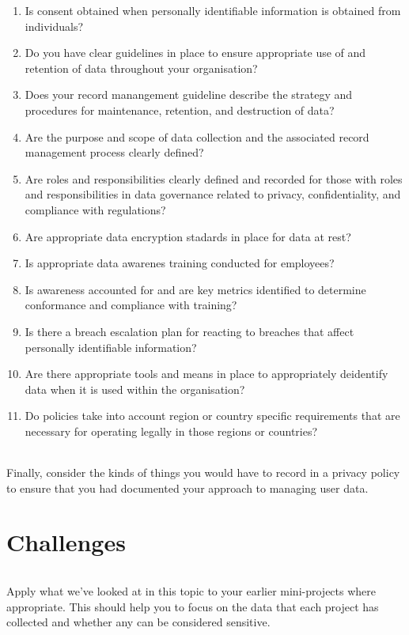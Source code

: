 \documentclass[10pt, a4paper, twosize]{article}
\begin{document}
\begin{enumerate}
\item Is consent obtained when personally identifiable information is obtained from individuals?
\item Do you have clear guidelines in place to ensure appropriate use of and retention of data throughout your organisation?
\item Does your record manangement guideline describe the strategy and procedures for maintenance, retention, and destruction of data?
\item Are the purpose and scope of data collection and the associated record management process clearly defined?
\item Are roles and responsibilities clearly defined and recorded for those with roles and responsibilities in data governance related to privacy, confidentiality, and compliance with regulations?
\item Are appropriate data encryption stadards in place for data at rest?
\item Is appropriate data awarenes training conducted for employees?
\item Is awareness accounted for and are key metrics identified to determine conformance and compliance with training?
\item Is there a breach escalation plan for reacting to breaches that affect personally identifiable information?
\item Are there appropriate tools and means in place to appropriately deidentify data when it is used within the organisation?
\item Do policies take into account region or country specific requirements that are necessary for operating legally in those regions or countries?
\end{enumerate}

\paragraph{} Finally, consider the kinds of things you would have to record in a privacy policy to ensure that you had documented your approach to managing user data.

\clearpage
\part{Challenges}
\paragraph{} Apply what we've looked at in this topic to your earlier mini-projects where appropriate. This should help you to focus on the data that each project has collected and whether any can be considered sensitive.
\end{document}
